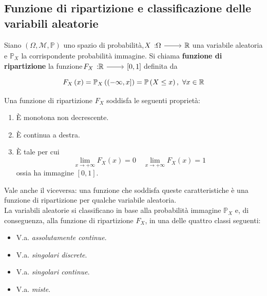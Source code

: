 \subsection{Funzione di ripartizione e classificazione delle variabili aleatorie}
\begin{define}
	Siano $\left(\Omega,\mathcal{M},\mathbb{P}\right)$ uno spazio di probabilità, $\funz{X}{\Omega}{\realset}$ una variabile aleatoria e $\mathbb{P}_X$ la corrispondente probabilità immagine. Si chiama \textbf{funzione di ripartizione} la funzione $\funz{F_X}{\realset}{\left[0,1\right]}$ definita da
	\begin{equation}
		F_X\left(x\right)=\mathbb{P}_X\left(\left(-\infty,x\right]\right)=\mathbb{P}\left(X\leq x\right),\ \forall x\in\mathbb{R}
	\end{equation}
\end{define}
Una funzione di ripartizione $F_X$ soddisfa le seguenti proprietà:
\begin{enumerate}
	\item È monotona non decrescente.
	\item È continua a destra.
	\item È tale per cui
	\begin{equation}
		\lim_{x\to+\infty}F_X\left(x\right)=0\quad\lim_{x\to+\infty}F_X\left(x\right)=1
	\end{equation}
ossia ha immagine $\left[0,1\right]$.
\end{enumerate}
Vale anche il viceversa: una funzione che soddisfa queste caratteristiche è una funzione di ripartizione per qualche variabile aleatoria.\\
La variabili aleatorie si classificano in base alla probabilità immagine $\mathbb{P}_X$ e, di conseguenza, alla funzione di ripartizione $F_X$, in una delle quattro classi seguenti:
\begin{itemize}
	\item V.a. \textit{assolutamente continue}.
	\item V.a. \textit{singolari discrete}.
	\item V.a. \textit{singolari continue}.
	\item V.a. \textit{miste}.
\end{itemize}
